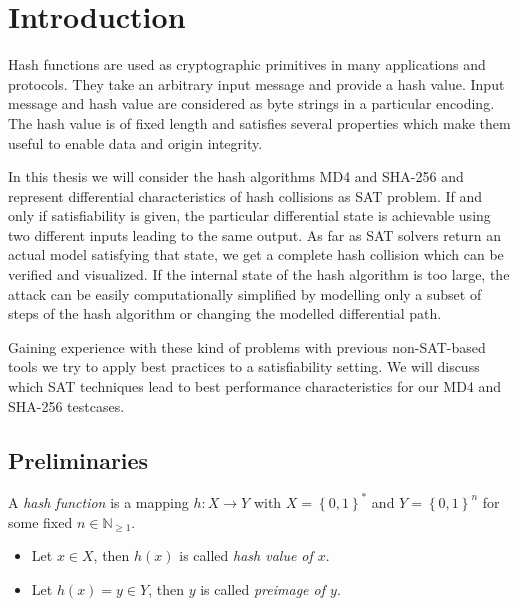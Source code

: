 \renewcommand*\chappic{img/intro.pdf}
\renewcommand*\chapquote{}
\chapter{Introduction}
\label{ch:intro}
%
Hash functions are used as cryptographic primitives in many applications and protocols.
They take an arbitrary input message and provide a hash value. Input message and hash value
are considered as byte strings in a particular encoding.
The hash value is of fixed length and satisfies several properties which make them useful
to enable data and origin integrity.

In this thesis we will consider the hash algorithms MD4 and SHA-256 and represent
differential characteristics of hash collisions as SAT problem. If and only if
satisfiability is given, the particular differential state is achievable
using two different inputs leading to the same output. As far as SAT solvers
return an actual model satisfying that state, we get a complete hash collision
which can be verified and visualized.
If the internal state of the hash algorithm is too large, the attack can be easily
computationally simplified by modelling only a subset of steps of the hash algorithm
or changing the modelled differential path.

Gaining experience with these kind of problems with previous non-SAT-based tools
we try to apply best practices to a satisfiability setting.
We will discuss which SAT techniques lead to best performance characteristics
for our MD4 and SHA-256 testcases.

\newpage  %
\section{Preliminaries}
\label{sec:intro-prelim}
%
\begin{defi}
  A \emph{hash function} is a mapping $h: X \to Y$ with $X = \left\{0,1\right\}^*$ and
  $Y = \left\{0,1\right\}^n$ for some fixed $n \in \mathbb N_{\geq 1}$.
  \begin{itemize}\itemsep0pt
    \item Let $x \in X$, then $h(x)$ is called \emph{hash value of $x$}.
    \item Let $h(x) = y \in Y$, then $y$ is called \emph{preimage of $y$}.
  \end{itemize}
\end{defi}

